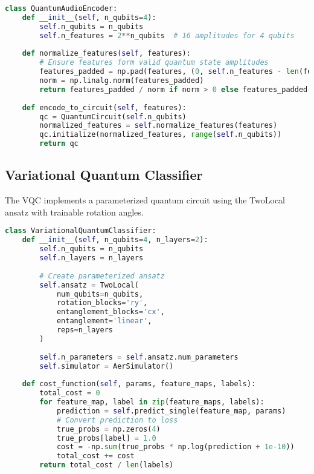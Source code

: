 \documentclass[11pt,a4paper]{article}
\begin{document}
\begin{lstlisting}[language=Python, caption=Quantum Audio Encoder Class]
class QuantumAudioEncoder:
    def __init__(self, n_qubits=4):
        self.n_qubits = n_qubits
        self.n_features = 2**n_qubits  # 16 amplitudes for 4 qubits
    
    def normalize_features(self, features):
        # Ensure features form valid quantum state amplitudes
        features_padded = np.pad(features, (0, self.n_features - len(features)))
        norm = np.linalg.norm(features_padded)
        return features_padded / norm if norm > 0 else features_padded
    
    def encode_to_circuit(self, features):
        qc = QuantumCircuit(self.n_qubits)
        normalized_features = self.normalize_features(features)
        qc.initialize(normalized_features, range(self.n_qubits))
        return qc
\end{lstlisting}

\subsection{Variational Quantum Classifier}

The VQC implements a parameterized quantum circuit using the TwoLocal ansatz with trainable rotation angles.

\begin{lstlisting}[language=Python, caption=Variational Quantum Classifier]
class VariationalQuantumClassifier:
    def __init__(self, n_qubits=4, n_layers=2):
        self.n_qubits = n_qubits
        self.n_layers = n_layers
        
        # Create parameterized ansatz
        self.ansatz = TwoLocal(
            num_qubits=n_qubits,
            rotation_blocks='ry',
            entanglement_blocks='cx',
            entanglement='linear',
            reps=n_layers
        )
        
        self.n_parameters = self.ansatz.num_parameters
        self.simulator = AerSimulator()
    
    def cost_function(self, params, feature_maps, labels):
        total_cost = 0
        for feature_map, label in zip(feature_maps, labels):
            prediction = self.predict_single(feature_map, params)
            # Convert prediction to loss
            true_probs = np.zeros(4)
            true_probs[label] = 1.0
            cost = -np.sum(true_probs * np.log(prediction + 1e-10))
            total_cost += cost
        return total_cost / len(labels)
\end{lstlisting}
\end{document}
